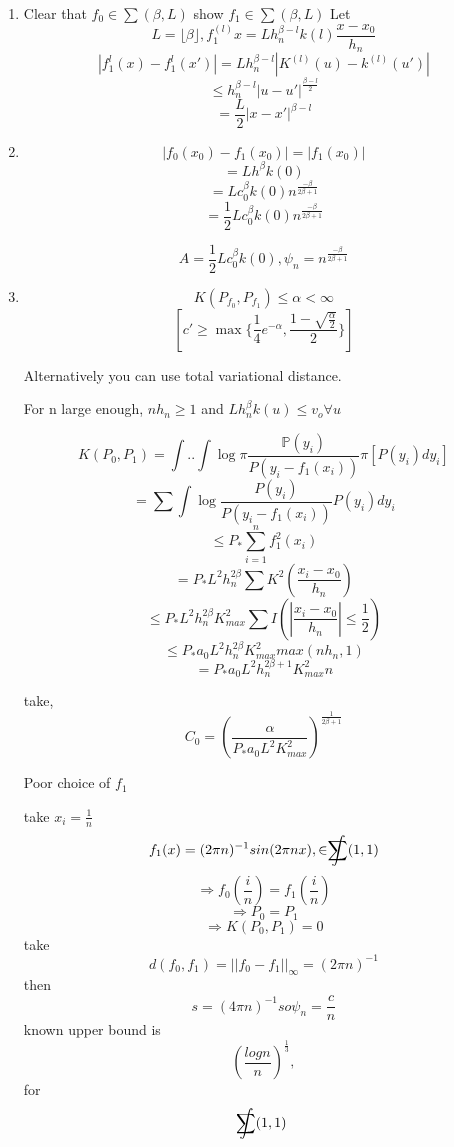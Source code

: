 \documentclass[10pt]{article}
\renewcommand{\P}{\mathbb{P}}
\begin{document}
\begin{enumerate}
\item Clear that $f_0 \in \sum (\beta,L)$
show $f_1 \in \sum (\beta,L)$
Let $$L = \lfloor{\beta}\rfloor, f_1^{(l)}x = Lh_n^{\beta-l}k{(l)}\frac{x-x_0}{h_n}$$
$$|f_1^l(x) - f_1^l(x')| = Lh_n^{\beta-l}|K^{(l)}(u) - k^{(l)}(u')|$$
$$\leq h_n^{\beta-l}|u - u'|^{\frac{\beta-l}{2}}$$
$$= \frac{L}{2} |x-x'|^{\beta-l}$$

\item $$|f_0(x_0) - f_1(x_0)| = |f_1(x_0)|$$
$$ = Lh^{\beta}k(0) $$
$$ = Lc_0^{\beta}k(0) n^{\frac{-\beta}{2\beta + 1}}$$
$$ = \frac{1}{2}Lc_0^{\beta}k(0) n^{\frac{-\beta}{2\beta + 1}}$$

$$A = \frac{1}{2}Lc_0^{\beta}k(0) , \psi_n = n^{\frac{-\beta}{2\beta + 1}}$$

\item $$K(P_{f_0}, P_{f_1}) \leq \alpha < \infty$$
$$\left[c' \geq \max\{\frac{1}{4}e^{-\alpha}, \frac{1-\sqrt{\frac{\alpha}{2}}}{2}\}\right]$$

Alternatively you can use total variational distance.

For n large enough,
$nh_n \geq 1$ and $ Lh_n^{\beta}k(u) \leq v_o \forall u$

$$K(P_0,P_1) = \int .. \int \log \pi \frac{\P(y_i)}{P(y_i - f_1(x_i))} \pi [P(y_i)dy_i]$$
$$= \sum \int \log \frac{P(y_i)}{P(y_i - f_1(x_i))} P(y_i)dy_i$$
$$\leq P_{*}\sum_{i=1}^{n} f_1^2(x_i)$$
$$= P_{*}L^2h_n^{2\beta} \sum K^2 (\frac{x_i - x_0}{h_n})$$
$$\leq P_{*}L^2h_n^{2\beta} K_{max}^2\sum I(|\frac{x_i - x_0}{h_n}| \leq \frac{1}{2})$$
$$\leq P_{*}a_0L^2h_n^{2\beta} K_{max}^2 max(nh_n,1)$$
$$= P_{*}a_0L^2h_n^{2\beta +1} K_{max}^2 n$$

take, $$C_0 = (\frac{\alpha}{P_{*}a_0L^2K_{max}^2})^\frac{1}{2\beta + 1}$$

Poor choice of $f_1$

take $x_i = \frac{1}{n} $
$$f_1(x) = (2\pi n)^{-1}sin(2\pi nx), \in \int\mathllap{\sum} (1,1)$$
$$\Rightarrow f_0(\frac{i}{n}) = f_1(\frac{i}{n})$$
$$\Rightarrow P_0 = P_1$$
$$\Rightarrow K(P_0,P_1) = 0$$
take $$d(f_0, f_1) = ||f_0 - f_1||_{\infty} = (2\pi n)^{-1}$$
then $$s = (4\pi n)^{-1} so \psi_n = \frac{c}{n}$$
known upper bound is $$(\frac{logn}{n})^\frac{1}{3}, $$
for  $$ \int\mathllap{\sum} (1,1)$$
\end{enumerate}



\end{document}
